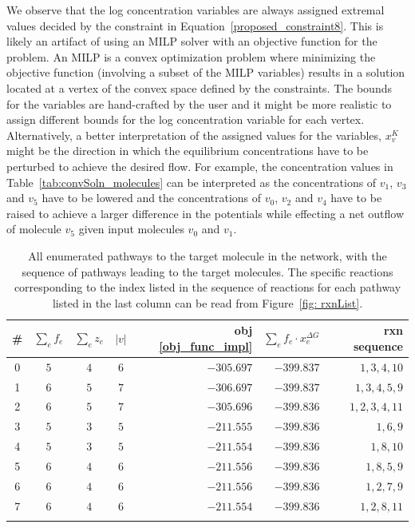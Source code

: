 We observe that the log concentration variables are always assigned extremal values decided by the constraint in Equation~\eqref{proposed_constraint8}.
This is likely an artifact of using an MILP solver with an objective function for the problem.
An MILP is a convex optimization problem where minimizing the objective function (involving a subset of the MILP variables) results in a solution located at a vertex of the convex space defined by the constraints.
The bounds for the variables are hand-crafted by the user and it might be more realistic to assign different bounds for the log concentration variable for each vertex.
Alternatively, a better interpretation of the assigned values for the variables, $x_v^K$ might be the direction in which the equilibrium concentrations have to be perturbed to achieve the desired flow.
For example, the concentration values in Table~\ref{tab:convSoln_molecules} can be interpreted as the concentrations of $v_1$, $v_3$ and $v_5$ have to be lowered and the concentrations of $v_0$, $v_2$ and $v_4$ have to be raised to achieve a larger difference in the potentials while effecting a net outflow of molecule $v_5$ given input molecules $v_0$ and $v_1$. 

\begin{table}[!t]
    \centering
    \begin{footnotesize}
    \begin{tabular}{ccccrrr}
        \\\toprule
        \# & $\sum_{e} f_e$ & $\sum_{e} z_e$ & $|v|$ & \hspace{0.1cm}obj \eqref{obj_func_impl} & $\sum_{e} f_e \cdot x_e^{\Delta G}$ & rxn sequence \\
        \midrule
        0 & $5$ & $4$ & $6$ & $-305.697$ & $-399.837$ & $1,3,4,10$ \\
        1 & $6$ & $5$ & $7$ & $-306.697$ & $-399.837$ & $1,3,4,5,9$ \\
        2 & $6$ & $5$ & $7$ & $-305.696$ & $-399.836$ & $1,2,3,4,11$ \\

		3 & $5$ & $3$ & $5$ & $-211.555$ & $-399.836$ & $1,6,9$ \\   
		4 & $5$ & $3$ & $5$ & $-211.554$ & $-399.836$ & $1,8,10$ \\
		5 & $6$ & $4$ & $6$ & $-211.556$ & $-399.836$ & $1,8,5,9$ \\
        6 & $6$ & $4$ & $6$ & $-211.556$ & $-399.836$ & $1,2,7,9$ \\     
        7 & $6$ & $4$ & $6$ & $-211.554$ & $-399.836$ & $1,2,8,11$ \\
        \bottomrule\\
    \end{tabular}
    \end{footnotesize}
    \caption{All enumerated pathways to the target molecule in the network, with the sequence of pathways leading to the target molecules. The specific reactions corresponding to the index listed in the sequence of reactions for each pathway listed in the last column can be read from Figure~\ref{fig: rxnList}. }
    \label{tab: thermo_flow}
\end{table}

